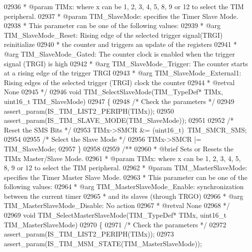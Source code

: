 \begin{DoxyCode}
02936 \textcolor{comment}{  * @param  TIMx: where x can be 1, 2, 3, 4, 5, 8, 9 or 12 to select the TIM peripheral.}
02937 \textcolor{comment}{  * @param  TIM\_SlaveMode: specifies the Timer Slave Mode.}
02938 \textcolor{comment}{  *          This parameter can be one of the following values:}
02939 \textcolor{comment}{  *            @arg TIM\_SlaveMode\_Reset: Rising edge of the selected trigger signal(TRGI) reinitialize
       }
02940 \textcolor{comment}{  *                                      the counter and triggers an update of the registers}
02941 \textcolor{comment}{  *            @arg TIM\_SlaveMode\_Gated:     The counter clock is enabled when the trigger signal
       (TRGI) is high}
02942 \textcolor{comment}{  *            @arg TIM\_SlaveMode\_Trigger:   The counter starts at a rising edge of the trigger TRGI}
02943 \textcolor{comment}{  *            @arg TIM\_SlaveMode\_External1: Rising edges of the selected trigger (TRGI) clock the
       counter}
02944 \textcolor{comment}{  * @retval None}
02945 \textcolor{comment}{  */}
02946 \textcolor{keywordtype}{void} TIM_SelectSlaveMode(TIM\_TypeDef* TIMx, uint16\_t TIM\_SlaveMode)
02947 \{
02948   \textcolor{comment}{/* Check the parameters */}
02949   assert_param(IS\_TIM\_LIST2\_PERIPH(TIMx));
02950   assert_param(IS\_TIM\_SLAVE\_MODE(TIM\_SlaveMode));
02951 
02952   \textcolor{comment}{/* Reset the SMS Bits */}
02953   TIMx->SMCR &= (uint16\_t)~TIM_SMCR_SMS;
02954 
02955   \textcolor{comment}{/* Select the Slave Mode */}
02956   TIMx->SMCR |= TIM\_SlaveMode;
02957 \}
02958 
02959 \textcolor{comment}{/**}
02960 \textcolor{comment}{  * @brief  Sets or Resets the TIMx Master/Slave Mode.}
02961 \textcolor{comment}{  * @param  TIMx: where x can be 1, 2, 3, 4, 5, 8, 9 or 12 to select the TIM peripheral.}
02962 \textcolor{comment}{  * @param  TIM\_MasterSlaveMode: specifies the Timer Master Slave Mode.}
02963 \textcolor{comment}{  *          This parameter can be one of the following values:}
02964 \textcolor{comment}{  *            @arg TIM\_MasterSlaveMode\_Enable: synchronization between the current timer}
02965 \textcolor{comment}{  *                                             and its slaves (through TRGO)}
02966 \textcolor{comment}{  *            @arg TIM\_MasterSlaveMode\_Disable: No action}
02967 \textcolor{comment}{  * @retval None}
02968 \textcolor{comment}{  */}
02969 \textcolor{keywordtype}{void} TIM_SelectMasterSlaveMode(TIM\_TypeDef* TIMx, uint16\_t TIM\_MasterSlaveMode)
02970 \{
02971   \textcolor{comment}{/* Check the parameters */}
02972   assert_param(IS\_TIM\_LIST2\_PERIPH(TIMx));
02973   assert_param(IS\_TIM\_MSM\_STATE(TIM\_MasterSlaveMode));

\end{DoxyCode}
